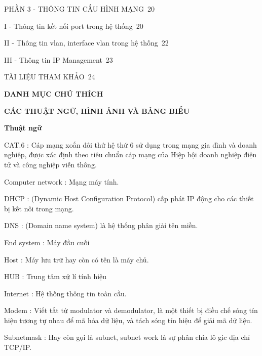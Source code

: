 \documentclass{report}
\begin{document}
\smallskip
PHẦN 3 -  THÔNG TIN CẤU HÌNH MẠNG\dotfill\ 20

\setlength{\parindent}{2cm}
\smallskip
I - Thông tin kết nối port trong hệ thống\dotfill\ 20

II - Thông tin vlan, interface vlan trong hệ thống\dotfill\ 22

III - Thông tin IP Management\dotfill\ 23

\setlength{\parindent}{0cm}
\smallskip
TÀI LIỆU THAM KHẢO\dotfill\ 24

\newpage
\changefontsizes{16pt}
\centerline{\textbf{DANH MỤC CHÚ THÍCH}}
\centerline{\textbf{CÁC THUẬT NGỮ, HÌNH ẢNH VÀ BẢNG BIỂU}}

\vspace{1cm}
\changefontsizes{14pt}
\textbf{Thuật ngữ}

\changefontsizes{13pt}



CAT.6 : Cáp mạng xoắn đôi thứ hệ thứ 6 sử dụng trong mạng gia đình và doanh nghiệp, được xác định theo tiêu chuẩn cáp mạng của Hiệp hội doanh nghiệp điện tử và công nghiệp viễn thông.

\vspace{0.2cm}
Computer network : Mạng máy tính.

\vspace{0.2cm}
DHCP : (Dynamic Host Configuration Protocol) cấp phát IP động cho các thiết bị kết nôi trong mạng.

\vspace{0.2cm}
DNS : (Domain name system) là hệ thống phân giải tên miền.

\vspace{0.2cm}
End system : Máy đầu cuối

\vspace{0.2cm}
Host : Máy lưu trữ hay còn có tên là máy chủ.

\vspace{0.2cm}
HUB : Trung tâm xử lí tính hiệu

\vspace{0.2cm}
Internet : Hệ thống thông tin toàn cầu.

\vspace{0.2cm}
Modem : Viết tắt từ modulator và demodulator, là một thiết bị điều chế sóng tín hiệu tương tự nhau để mã hóa dữ liệu, và tách sóng tín hiệu để giải mã dữ liệu.

\vspace{0.2cm}
Subnetmask : Hay còn gọi là subnet, subnet work là sự phân chia lô gic địa chỉ TCP/IP.
\end{document}
